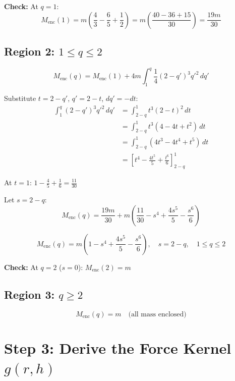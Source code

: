\documentclass[12pt]{article}
\begin{document}
\textbf{Check:} At $q = 1$:
\begin{equation}
M_{\text{enc}}(1) = m\left(\frac{4}{3} - \frac{6}{5} + \frac{1}{2}\right) = m\left(\frac{40 - 36 + 15}{30}\right) = \frac{19m}{30}
\end{equation}

\subsection{Region 2: $1 \leq q \leq 2$}

\begin{equation}
M_{\text{enc}}(q) = M_{\text{enc}}(1) + 4m \int_1^q \frac{1}{4}(2-q')^3 q'^2 \, dq'
\end{equation}

Substitute $t = 2 - q'$, $q' = 2 - t$, $dq' = -dt$:
\begin{align}
\int_1^q (2-q')^3 q'^2 \, dq' &= \int_{2-q}^1 t^3 (2-t)^2 \, dt \\
&= \int_{2-q}^1 t^3 (4 - 4t + t^2) \, dt \\
&= \int_{2-q}^1 (4t^3 - 4t^4 + t^5) \, dt \\
&= \left[t^4 - \frac{4t^5}{5} + \frac{t^6}{6}\right]_{2-q}^1
\end{align}

At $t = 1$: $1 - \frac{4}{5} + \frac{1}{6} = \frac{11}{30}$

Let $s = 2 - q$:
\begin{equation}
M_{\text{enc}}(q) = \frac{19m}{30} + m\left(\frac{11}{30} - s^4 + \frac{4s^5}{5} - \frac{s^6}{6}\right)
\end{equation}

\begin{equation}
\boxed{M_{\text{enc}}(q) = m\left(1 - s^4 + \frac{4s^5}{5} - \frac{s^6}{6}\right), \quad s = 2-q, \quad 1 \leq q \leq 2}
\end{equation}

\textbf{Check:} At $q = 2$ ($s = 0$): $M_{\text{enc}}(2) = m$ \checkmark

\subsection{Region 3: $q \geq 2$}
\begin{equation}
M_{\text{enc}}(q) = m \quad \text{(all mass enclosed)}
\end{equation}

\section{Step 3: Derive the Force Kernel $g(r, h)$}
\end{document}
